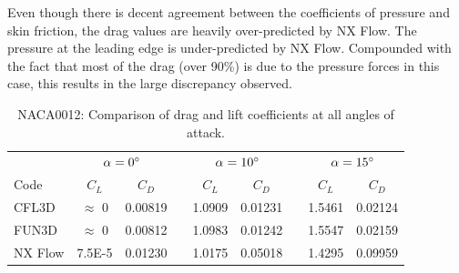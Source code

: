 Even though there is decent agreement between the coefficients of pressure and skin friction, the drag values are heavily over-predicted by NX Flow. The pressure at the leading edge is under-predicted by NX Flow. Compounded with the fact that most of the drag (over 90\%) is due to the pressure forces in this case, this results in the large discrepancy observed.
\begin{table}
    \centering
    \caption{NACA0012: Comparison of drag and lift coefficients at all angles of attack.}
    \label{tab:naca0012}
    \begin{tabular}{@{}l cc c cc c cc@{}}
        \toprule
         & \multicolumn{2}{c}{$\alpha = 0^\circ$} & \phantom{a}
            & \multicolumn{2}{c}{$\alpha = 10^\circ$} & \phantom{a}
            & \multicolumn{2}{c}{$\alpha = 15^\circ$}\\
        \cline{2-3} \cline{5-6} \cline{8-9}
        Code & $C_L$ & $C_D$ && $C_L$ & $C_D$ && $C_L$ & $C_D$ \\
        \midrule
        CFL3D & $\approx$ 0 & 0.00819 && 1.0909 & 0.01231 && 1.5461 & 0.02124 \\
        FUN3D & $\approx$ 0 & 0.00812 && 1.0983 & 0.01242 && 1.5547 & 0.02159 \\
        NX Flow & 7.5E-5    & 0.01230 && 1.0175 & 0.05018 && 1.4295 & 0.09959 \\
        \bottomrule
    \end{tabular}
\end{table}

